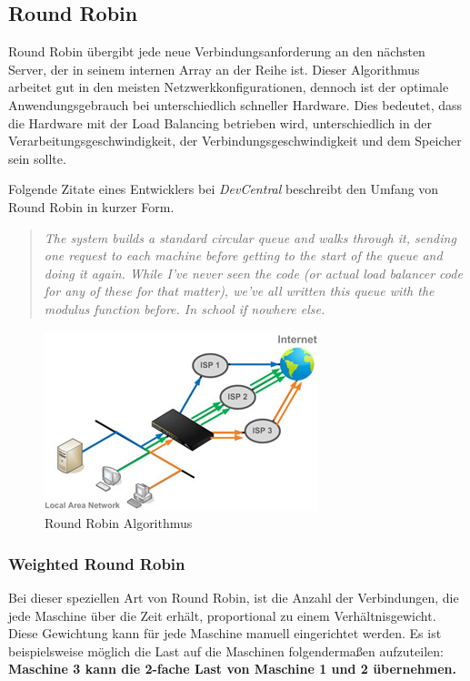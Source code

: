 \newpage

\subsection{Round Robin}
\label{Round Robin}
Round Robin übergibt jede neue Verbindungsanforderung an den nächsten Server, der in seinem internen Array an der Reihe ist. Dieser Algorithmus arbeitet gut in den meisten Netzwerkkonfigurationen, dennoch ist der optimale Anwendungsgebrauch bei unterschiedlich schneller Hardware. Dies bedeutet, dass die Hardware mit der Load Balancing betrieben wird, unterschiedlich in der Verarbeitungsgeschwindigkeit, der Verbindungsgeschwindigkeit und dem Speicher sein sollte.

Folgende Zitate eines Entwicklers bei \textit{DevCentral} beschreibt den Umfang von Round Robin in kurzer Form.
\begin{quote}
	\textit{The system builds a standard circular queue and walks through it, sending one request to each machine before getting to the start of the queue and doing it again. While I’ve never seen the code (or actual load balancer code for any of these for that matter), we’ve all written this queue with the modulus function before. In school if nowhere else.}
\end{quote}

\begin{figure}[!h]
	\begin{center}
		\includegraphics[width=0.5\linewidth]{images/lb_weighted}
		\caption{Round Robin Algorithmus}
		\label{broker}
	\end{center}
\end{figure}

\subsubsection{Weighted Round Robin}
Bei dieser speziellen Art von Round Robin, ist die Anzahl der Verbindungen, die jede Maschine über die Zeit erhält, proportional zu einem Verhältnisgewicht. Diese Gewichtung kann für jede Maschine manuell eingerichtet werden. Es ist beispielsweise möglich die Last auf die Maschinen folgendermaßen aufzuteilen: \textbf{Maschine 3 kann die 2-fache Last von Maschine 1 und 2 übernehmen.}

